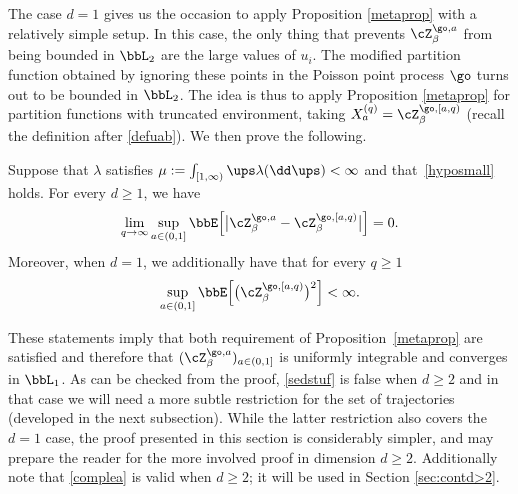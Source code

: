 The case $d=1$ gives us the occasion to apply Proposition \ref{metaprop} with a relatively simple setup. In this case, the only thing that prevents $\cZ^{\go,a}_{\beta}$ from being bounded in $\bbL_2$ are the large values of $u_i$. The modified partition function obtained by
ignoring these points in the Poisson point process $\go$ turns out to be bounded in $\bbL_2$.
The idea is thus to apply Proposition \ref{metaprop} for partition functions with truncated environment, taking
$X^{(q)}_a= \cZ^{\go,[a,q)}_{\beta}$ (recall the definition after \eqref{defuab}).
We then prove the following.

\begin{proposition}\label{d11}
Suppose that $\lambda$ satisfies $\mu:=\int_{[1,\infty)} \ups \lambda (\dd \ups) <\infty$ and that~\eqref{hyposmall} holds.
For every $d\ge 1$, we have
\begin{equation}\label{complea}
\lim_{q\to \infty} \sup_{a\in (0,1]} \bbE \Bigl[ \big| \cZ^{\go,a}_{\beta}- \cZ^{\go,[a,q)}_{\beta} \big| \Bigr]=0.
\end{equation}
Moreover, when $d=1$, we additionally have that for every $q\ge 1$
\begin{equation}\label{sedstuf}
\sup_{a\in(0,1]} \bbE\Bigl[ \bigl(\cZ^{\go,[a,q)}_{\beta} \bigr)^2\Bigr]<\infty.
\end{equation}
\end{proposition}

These statements imply that both requirement of Proposition~\ref{metaprop} are satisfied and therefore that $(\cZ^{\go,a}_{\beta})_{a\in(0,1]}$ is uniformly integrable and converges in $\bbL_1$. As can be checked from the proof, \eqref{sedstuf} is false when $d\ge 2$ and in that case we will need a more subtle restriction for the set of trajectories (developed in the next subsection). While the latter restriction also covers the $d=1$ case, the proof presented in this section is considerably simpler,
and may prepare the reader for the more involved proof in dimension $d\geq 2$.
Additionally note that \eqref{complea} is valid when $d\ge 2$; it will be used in Section \ref{sec:contd>2}.

